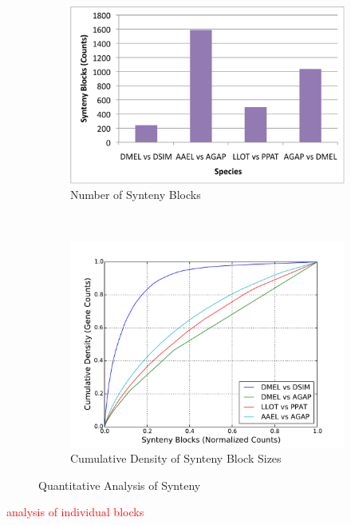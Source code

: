 \begin{figure}[H]
  \centering
  \begin{subfigure}[b]{0.45\textwidth}
    \includegraphics[width=\textwidth]{figures/synteny/block_counts}
    \caption{Number of Synteny Blocks}
    \label{fig:synteny-dist-counts}
  \end{subfigure}
  ~
  \begin{subfigure}[b]{0.45\textwidth}
    \includegraphics[width=\textwidth]{figures/synteny/sandflies_mosquitoes_drosophila_orth_cdf}
    \caption{Cumulative Density of Synteny Block Sizes}
    \label{fig:synteny-dist-cdf}
  \end{subfigure}
\label{fig:synteny-dist}
\caption{Quantitative Analysis of Synteny}
\end{figure}

\textcolor{red}{analysis of individual blocks}

